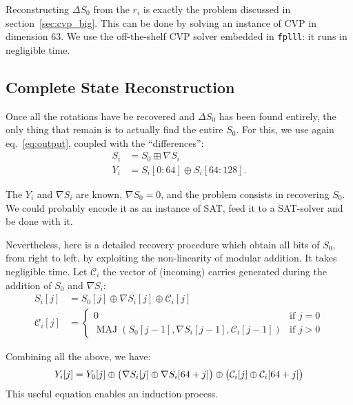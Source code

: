 \documentclass[submission,svgnames,journal=tosc]{iacrtrans}
\DeclareMathOperator{\MAJ}{MAJ}
\begin{document}
Reconstructing $\Delta S_0$ from the $r_i$ is exactly the problem discussed in
section~\ref{sec:cvp_big}. This can be done by solving an instance of CVP in
dimension $63$. We use the off-the-shelf CVP solver embedded in \texttt{fplll}:
it runs in negligible time.

\subsection{Complete State Reconstruction}

Once all the rotations have be recovered and $\Delta S_0$ has been found
entirely, the only thing that remain is to actually find the entire $S_0$. For
this, we use again eq.~\eqref{eq:output}, coupled with the ``differences'':
\begin{align*}
  S_i &= S_0 \boxplus \nabla S_i \\
  Y_i &= S_i[0:64] \oplus S_i[64:128].
\end{align*}

The $Y_i$ and $\nabla S_i$ are known, $\nabla S_0 = 0$, and the problem consists
in recovering $S_0$. We could probably encode it as an instance of \textsf{SAT},
feed it to a SAT-solver and be done with it.

Nevertheless, here is a detailed recovery procedure which obtain all bits of
$S_0$, from right to left, by exploiting the non-linearity of modular
addition. It takes negligible time. Let $\mathcal{C}_i$ the vector of (incoming)
carries generated during the addition of $S_0$ and $\nabla S_i$:
\begin{align*}
  S_i[j]           &= S_0[j] \oplus \nabla S_i[j] \oplus \mathcal{C}_i[j]\\
  \mathcal{C}_i[j] &= \begin{cases}
    0 &\text{if } j = 0 \\
    \MAJ(S_0[j-1], \nabla S_i[j-1], \mathcal{C}_i[j-1]) &\text{if } j > 0
  \end{cases}
\end{align*}

Combining all the above, we have:
\begin{equation}\label{eq:master}
  Y_i[j] = Y_0[j] \oplus \bigl( \nabla S_i[j] \oplus \nabla S_i[64+j] \bigr) \oplus \bigl(\mathcal{C}_i[j] \oplus \mathcal{C}_i[64+j]\bigr)\\
\end{equation}
This useful equation enables an induction process.
\end{document}
